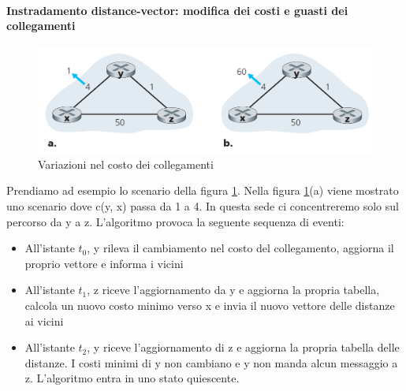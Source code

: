 \documentclass[11pt,a4paper]{book}
\begin{document}
\paragraph{Instradamento distance-vector: modifica dei costi e guasti dei collegamenti}
\begin{figure}
	\includegraphics[scale=0.5]{img/065.png}
	\caption{Variazioni nel costo dei collegamenti}
	\label{fig: 065}
\end{figure}
Prendiamo ad esempio lo scenario della figura \ref{fig: 065}. Nella figura \ref{fig: 065}(a) viene mostrato uno scenario dove c(y, x) passa da 1 a 4. In questa sede ci concentreremo solo sul percorso da y a z. L'algoritmo provoca la seguente sequenza di eventi:
\begin{itemize}
	\item All'istante $t_{0}$, y rileva il cambiamento nel costo del collegamento, aggiorna il proprio vettore e informa i vicini
	\item All'istante $t_{1}$, z riceve l'aggiornamento da y e aggiorna la propria tabella, calcola un nuovo costo minimo verso x e invia il nuovo vettore delle distanze ai vicini
	\item All'istante $t_{2}$, y riceve l'aggiornamento di z e aggiorna la propria tabella delle distanze. I costi minimi di y non cambiano e y non manda alcun messaggio a z. L'algoritmo entra in uno stato quiescente.
\end{itemize}
\end{document}
